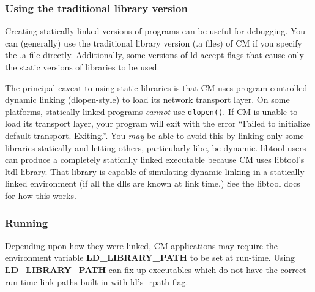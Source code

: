 \documentclass[11pt]{article}
\begin{document}
\subsubsection{Using the traditional library version}
Creating statically linked versions of programs can be useful for debugging.
You can (generally) use the traditional library version (.a files) of CM if
you specify the .a file directly. Additionally, some versions of ld accept
flags that cause only the static versions of libraries to be used.  

The principal caveat to using static
libraries is that CM uses program-controlled dynamic linking (dlopen-style)
to load its network transport layer. On some platforms, statically linked
programs {\it cannot} use {\tt dlopen()}. If CM is unable to load its
transport layer, your program will exit with the error ``Failed to initialize
default transport. Exiting.''. You {\it may} be able to avoid this by
linking only some libraries statically and letting others, particularly
libc, be dynamic. libtool users can produce a completely statically linked
executable because CM uses libtool's ltdl library. That library is capable
of simulating dynamic linking in a statically linked environment (if all
the dlls are known at link time.) See the libtool docs for how this works.

\subsubsection{Running}
Depending upon how they were linked, CM applications may require the
environment variable
{\bf LD\_LIBRARY\_PATH} to be set at run-time. Using 
{\bf LD\_LIBRARY\_PATH}
can fix-up executables which do not have the correct run-time link paths
built in with ld's -rpath flag.
\end{document}
